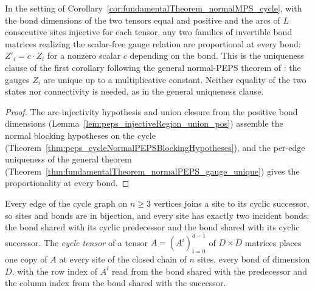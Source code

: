 \begin{corollary}%
    \label{cor:fundamentalTheorem_normalMPS_cycle_gauge_unique}
    \leanok
    In the setting of
    Corollary~\ref{cor:fundamentalTheorem_normalMPS_cycle}, with the bond
    dimensions of the two tensors equal and positive and the arcs of $L$
    consecutive sites injective for each tensor, any two families of
    invertible bond matrices realizing the scalar-free gauge relation are
    proportional at every bond: $Z'_i = c \cdot Z_i$ for a nonzero scalar
    $c$ depending on the bond.  This is the uniqueness clause of the first
    corollary following the general normal-PEPS theorem of
    \cite[Section~3]{Molnar2018NormalPEPS}: the gauges $Z_i$ are unique up
    to a multiplicative constant.  Neither equality of the two states nor
    connectivity is needed, as in the general uniqueness clause.
\end{corollary}
\begin{proof}\leanok
    The arc-injectivity hypothesis and union closure from the positive bond
    dimensions (Lemma~\ref{lem:peps_injectiveRegion_union_pos}) assemble the
    normal blocking hypotheses on the cycle
    (Theorem~\ref{thm:peps_cycleNormalPEPSBlockingHypotheses}), and the
    per-edge uniqueness of the general theorem
    (Theorem~\ref{thm:fundamentalTheorem_normalPEPS_gauge_unique}) gives the
    proportionality at every bond.
\end{proof}

\begin{definition}%
    \label{def:cycleTensorOfMPS}
    \leanok
    Every edge of the cycle graph on $n \ge 3$ vertices joins a site to its
    cyclic successor, so sites and bonds are in bijection, and every site has
    exactly two incident bonds: the bond shared with its cyclic predecessor
    and the bond shared with its cyclic successor.  The \emph{cycle tensor}
    of a tensor $A = (A^i)_{i=0}^{d-1}$ of $D \times D$ matrices places one
    copy of $A$ at every site of the closed chain of $n$ sites, every bond of
    dimension $D$, with the row index of $A^i$ read from the bond shared with
    the predecessor and the column index from the bond shared with the
    successor.
\end{definition}

